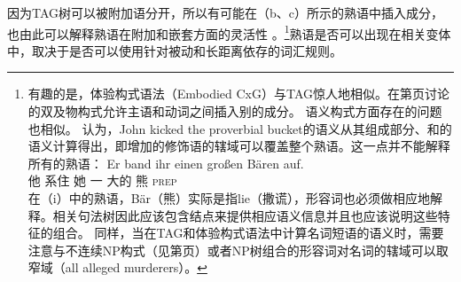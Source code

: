 因为TAG树可以被附加语分开，所以有可能在（b、c）所示的熟语中插入成分，也由此可以解释熟语在附加和嵌套方面的灵活性 。\footnote{%
有趣的是，体验构式语法（Embodied CxG）与TAG惊人地相似。在第\pageref{CxG-Active-Ditransitive}页讨论的双及物构式允许主语和动词之间插入别的成分。
	语义构式方面存在的问题也相似。 \citet[]{AS89a}认为，John kicked the proverbial bucket的语义从其组成部分、和的语义计算得出，即增加的修饰语的辖域可以覆盖整个熟语。这一点并不能解释所有的熟语\citep{FK96a}：
\ea
\gll Er band ihr einen großen Bären auf.\\
	 他 系住 她 一 大的 熊 \textsc{prep}\\
\z
在（i）中的熟语，Bär（熊）实际是指lie（撒谎），形容词也必须做相应地解释。相关句法树因此应该包含结点来提供相应语义信息并且也应该说明这些特征的组合。
同样，当在TAG和体验构式语法中计算名词短语的语义时，需要注意与不连续NP构式（见第\pageref{CxG-DetNoun}页）或者NP树组合的形容词对名词的辖域可以取窄域（all alleged murderers）。
}熟语是否可以出现在相关变体中，取决于是否可以使用针对被动和长距离依存的词汇规则。
	

